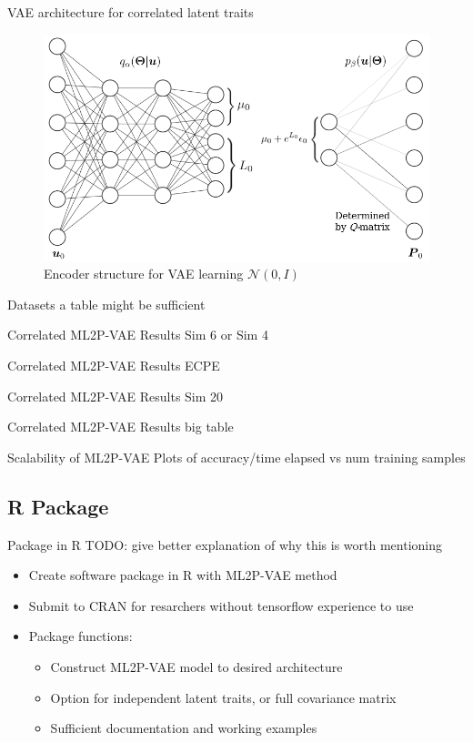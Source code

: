 \documentclass{beamer}
\theoremstyle{definition}
\begin{document}
\begin{frame}{VAE architecture for correlated latent traits}
  \begin{figure}
  \includegraphics[width=.7\textwidth]{../img/ml2pvae_visual.png}
\caption*{Encoder structure for VAE learning $\mathcal{N}(0,I)$}
\end{figure}
\end{frame}

\begin{frame}{Datasets}
  a table might be sufficient
\end{frame}

\begin{frame}{Correlated ML2P-VAE Results}
  Sim 6 or Sim 4
\end{frame}

\begin{frame}{Correlated ML2P-VAE Results}
  ECPE
\end{frame}

\begin{frame}{Correlated ML2P-VAE Results}
  Sim 20
\end{frame}

\begin{frame}{Correlated ML2P-VAE Results}
  big table
\end{frame}

\begin{frame}{Scalability of ML2P-VAE}
  Plots of accuracy/time elapsed vs num training samples
\end{frame}

\subsection{R Package}
\begin{frame}{Package in R}
  TODO: give better explanation of why this is worth mentioning %
\begin{itemize}
  \item Create software package in R with ML2P-VAE method
  \item Submit to CRAN for resarchers without tensorflow experience to use
  \item<2-> Package functions:
  \begin{itemize}
    \item<2-> Construct ML2P-VAE model to desired architecture
    \item<2-> Option for independent latent traits, or full covariance matrix
    \item<2-> Sufficient documentation and working examples
  \end{itemize}
\end{itemize}
\end{frame}
\end{document}

